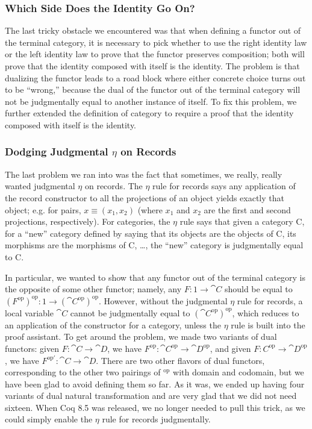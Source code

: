     \subsubsection{Which Side Does the Identity Go On?}
      The last tricky obstacle we encountered was that when defining a functor out of the terminal category, it is necessary to pick whether to use the right identity law or the left identity law to prove that the functor preserves composition; both will prove that the identity composed with itself is the identity.
      The problem is that dualizing the functor leads to a road block where either concrete choice turns out to be ``wrong,'' because the dual of the functor out of the terminal category will not be judgmentally equal to another instance of itself.
      To fix this problem, we further extended the definition of category to require a proof that the identity composed with itself is the identity.

    \subsubsection{Dodging Judgmental \texorpdfstring{$\eta$}{η} on Records}  \label{sec:no-judgmental-eta}
      The last problem we ran into was the fact that sometimes, we really, really wanted judgmental $\eta$ on records.
      The $\eta$ rule for records says any application of the record constructor to all the projections of an object yields exactly that object; e.g. for pairs, $x \equiv (x_1, x_2)$ (where $x_1$ and $x_2$ are the first and second projections, respectively).
      For categories, the $\eta$ rule says that given a category \cat C, for a ``new'' category defined by saying that its objects are the objects of \cat C, its morphisms are the morphisms of \cat C, \ldots, the ``new'' category is judgmentally equal to \cat C.

      In particular, we wanted to show that any functor out of the terminal category is the opposite of some other functor; namely, any $F : 1 \to \cat C$ should be equal to $(F^{\text{op}})^{\text{op}} : 1 \to (\cat C^{\text{op}})^{\text{op}}$.
      However, without the judgmental $\eta$ rule for records, a local variable $\cat C$ cannot be judgmentally equal to $(\cat C^{\text{op}})^{\text{op}}$, which reduces to an application of the constructor for a category, unless the $\eta$ rule is built into the proof assistant.
      To get around the problem, we made two variants of dual functors: given $F : \cat C \to \cat D$, we have $F^{\text{op}} : \cat C^{\text{op}} \to \cat D^{\text{op}}$, and given $F : C^{\text{op}} \to \cat D^{\text{op}}$, we have $F^{\text{op}'} : \cat C \to \cat D$.
      There are two other flavors of dual functors, corresponding to the other two pairings of ${}^{\text{op}}$ with domain and codomain, but we have been glad to avoid defining them so far.  As it was, we ended up having four variants of dual natural transformation and are very glad that we did not need sixteen.
      When Coq 8.5 was released, we no longer needed to pull this trick, as we could simply enable the $\eta$ rule for records judgmentally.


